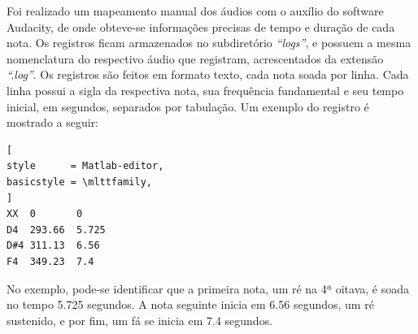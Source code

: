 Foi realizado um mapeamento manual dos áudios com o auxílio do software Audacity\cite{audacity2018}, de onde obteve-se informações precisas de tempo e duração de cada nota. Os registros ficam armazenados no subdiretório \textit{``logs''}, e possuem a mesma nomenclatura do respectivo áudio que registram, acrescentados da extensão \textit{``.log''}. Os registros são feitos em formato texto, cada nota soada por linha. Cada linha possui a sigla da respectiva nota, sua frequência fundamental e seu tempo inicial, em segundos, separados por tabulação. Um exemplo do registro é mostrado a seguir:
\\ 
\begin{lstlisting}[
style      = Matlab-editor,
basicstyle = \mlttfamily,
]
XX  0       0
D4  293.66  5.725
D#4 311.13  6.56
F4  349.23  7.4
\end{lstlisting}



No exemplo, pode-se identificar que a primeira nota, um ré na 4ª oitava, é soada no tempo 5.725 segundos. A nota seguinte inicia em 6.56 segundos, um ré sustenido, e por fim, um fá se inicia em 7.4 segundos.

